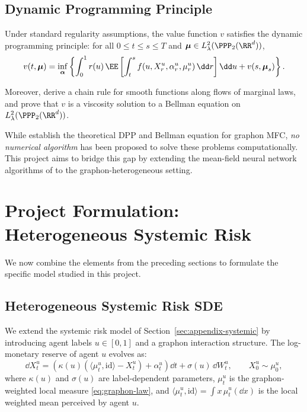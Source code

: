\documentclass[11pt]{article}
\begin{document}
\subsection{Dynamic Programming Principle}

\begin{theorem}
  Under standard regularity assumptions, the value function $v$ satisfies the dynamic programming principle: for all $0 \le t \le s \le T$ and $\boldsymbol{\mu} \in L^2_\lambda(\PPP_2(\RR^d))$,
  \begin{equation}
    v(t, \boldsymbol{\mu}) = \inf_{\boldsymbol{\alpha}} \left\{ \int_0^1 r(u)\,\EE\left[\int_t^s f\!\left(u, X_r^u, \alpha_r^u, \mu_r^u\right)\dd r\right]\dd u + v(s, \boldsymbol{\mu}_s) \right\}.
  \end{equation}
\end{theorem}

Moreover, \citet{decrescenzo2026mfc} derive a chain rule for smooth functions along flows of marginal laws, and prove that $v$ is a viscosity solution to a Bellman equation on $L^2_\lambda(\PPP_2(\RR^d))$.

\begin{remark}
  While \citet{decrescenzo2026mfc} establish the theoretical DPP and Bellman equation for graphon MFC, \emph{no numerical algorithm} has been proposed to solve these problems computationally. This project aims to bridge this gap by extending the mean-field neural network algorithms of \citet{pham2024mfnn} to the graphon-heterogeneous setting.
\end{remark}


\section{Project Formulation: Heterogeneous Systemic Risk}\label{sec:appendix-formulation}

We now combine the elements from the preceding sections to formulate the specific model studied in this project.

\subsection{Heterogeneous Systemic Risk SDE}

We extend the systemic risk model of Section~\ref{sec:appendix-systemic} by introducing agent labels $u \in [0,1]$ and a graphon interaction structure. The log-monetary reserve of agent $u$ evolves as:
\begin{equation}\label{eq:hetero-sde}
  \dd X_t^u = \left(\kappa(u)\left(\langle \mu_t^u, \mathrm{id}\rangle - X_t^u\right) + \alpha_t^u\right)\dd t + \sigma(u)\,\dd W_t^u, \qquad X_0^u \sim \mu_0^u,
\end{equation}
where $\kappa(u)$ and $\sigma(u)$ are label-dependent parameters, $\mu_t^u$ is the graphon-weighted local measure \eqref{eq:graphon-law}, and $\langle \mu_t^u, \mathrm{id} \rangle = \int x\,\mu_t^u(\dd x)$ is the local weighted mean perceived by agent $u$.
\end{document}
